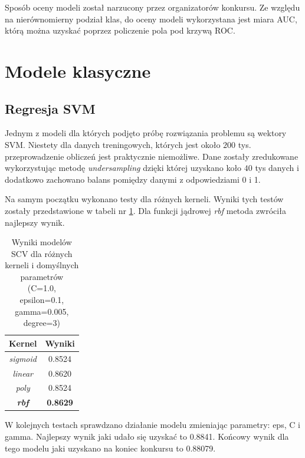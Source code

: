 \documentclass[12pt]{article}
\begin{document}
Sposób oceny modeli został narzucony przez organizatorów konkursu. Ze względu na nierównomierny podział klas, do oceny modeli wykorzystana jest miara AUC, którą można uzyskać poprzez policzenie pola pod krzywą ROC.


\section{Modele klasyczne}

\subsection{Regresja SVM}
Jednym z modeli dla których podjęto próbę rozwiązania problemu są wektory SVM. Niestety dla danych treningowych, których jest około $200$ tys. przeprowadzenie obliczeń jest praktycznie niemożliwe. Dane zostały zredukowane wykorzystując metodę \textit{undersampling} dzięki której uzyskano koło $40$ tys danych i dodatkowo zachowano balans pomiędzy danymi z odpowiedziami 0 i 1.

Na samym początku wykonano testy dla różnych kerneli. Wyniki tych testów zostały przedstawione w tabeli nr \ref{tab:svm_kernels}. Dla funkcji jądrowej \textit{rbf} metoda zwróciła najlepszy wynik.
\begin{table}[H]
    \centering
    \begin{tabular}{|c|c|}
    \hline
    Kernel & Wyniki \\
    \hline
    \hline
    \textit{sigmoid} &	0.8524 \\
    \hline
    \textit{linear} &	0.8620 \\
    \hline
    \textit{poly} &	0.8524 \\
    \hline
    \textbf{\textit{rbf}} &	\textbf{0.8629} \\
    \hline
    \end{tabular}
    \caption{Wyniki modelów SCV dla różnych kerneli i domyślnych parametrów (C=1.0, epsilon=0.1, gamma=0.005, degree=3)}
    \label{tab:svm_kernels}
\end{table}

W kolejnych testach sprawdzano działanie modelu zmieniając parametry: eps, C i gamma. Najlepszy wynik jaki udało się uzyskać to 0.8841. Końcowy wynik dla tego modelu jaki uzyskano na koniec konkursu to 0.88079.
\end{document}
